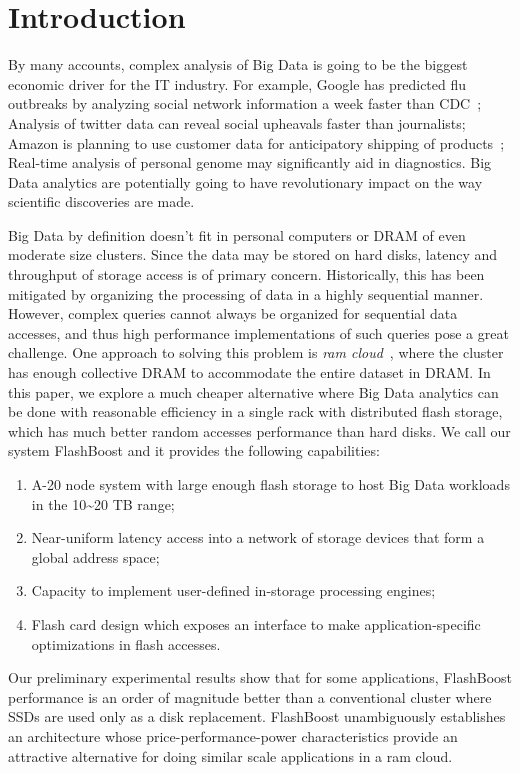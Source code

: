 \section{Introduction}
\label{sec:intro}
By many accounts, complex analysis of Big Data is going to be the biggest
economic driver for the IT industry. For example, Google has predicted flu
outbreaks by analyzing social network information a week faster than
CDC~\cite{googleflu}; Analysis of twitter data can reveal social upheavals
faster than journalists; Amazon is planning to use customer data for
anticipatory
shipping of products~\cite{amazonanticipatory}; Real-time analysis of personal genome may significantly
aid in diagnostics. Big Data analytics are potentially going to have
revolutionary impact on the way scientific discoveries are made. 

Big Data by definition doesn’t fit in personal computers or DRAM of even
moderate size clusters. Since the data may be stored on hard disks, latency and
throughput of storage access is of primary concern. Historically, this has been
mitigated by organizing the processing of data in a highly sequential manner.
However, complex queries cannot always be organized for sequential data
accesses, and thus high performance implementations of such queries pose a great
challenge. One approach to solving this problem is \emph{ram
cloud}~\cite{ramcloud}, where the cluster has enough collective DRAM to
accommodate the entire dataset in DRAM.  In this paper, we explore a much
cheaper alternative where Big Data analytics can be done with reasonable
efficiency in a single rack with distributed flash storage, which has much
better random accesses performance than hard disks.  We call our system
FlashBoost and it provides the following capabilities:

\begin{enumerate}
\item A-20 node system with large enough flash storage to host Big Data workloads in the 10\textasciitilde20 TB range;
\item Near-uniform latency access into a network of storage devices that form a global address space;
\item Capacity to implement user-defined in-storage processing engines;
\item Flash card design which exposes an interface to make application-specific optimizations in flash accesses.
\end{enumerate}

Our preliminary experimental results show that for some applications, FlashBoost
performance is an order of magnitude better than a conventional cluster where
SSDs are used only as a disk replacement. FlashBoost unambiguously establishes
an architecture whose price-performance-power characteristics provide an
attractive alternative for doing similar scale applications in a ram cloud.

